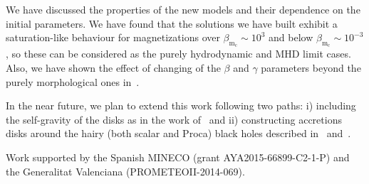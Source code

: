 \documentclass{aa}
\begin{document}
We have discussed the properties of the new models and their dependence on the initial parameters. We have found that the solutions we have built exhibit a saturation-like behaviour for magnetizations over $\beta_{\mathrm{m}_{\mathrm{c}}} \sim 10^{3}$ and below $\beta_{\mathrm{m}_{\mathrm{c}}} \sim 10^{-3}$, so these can be considered as the purely hydrodynamic and MHD limit cases. Also, we have shown the effect of changing of the $\beta$ and $\gamma$ parameters beyond the purely morphological ones in~\citet{Qian:2009}.

In the near future, we plan to extend this work following two paths: i) including the self-gravity of the disks as in the work of~\citet{Stergioulas:2011} and ii) constructing accretions disks around the hairy (both scalar and Proca) black holes described in~\citet{Herdeiro:2014} and~\citet{Herdeiro:2016}.

\begin{acknowledgements}
      Work supported by the Spanish MINECO (grant AYA2015-66899-C2-1-P) and the Generalitat Valenciana (PROMETEOII-2014-069).
\end{acknowledgements}



\end{document}
